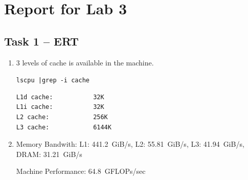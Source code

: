 \documentclass[a4paper, DIV12, headsepline]{scrartcl}
\begin{document}
\section*{Report for Lab 3}
\subsection*{Task 1 -- ERT}
\begin{enumerate}[label=\alph*)]
\item 3 levels of cache is available in the machine.

 \texttt{lscpu |grep -i cache}
\begin{verbatim}
L1d cache:           32K
L1i cache:           32K
L2 cache:            256K
L3 cache:            6144K
\end{verbatim}

\item
Memory Bandwith: L1: \SI{441.2}{GiB/s}, L2: \SI{55.81}{GiB/s}, L3: \SI{41.94}{GiB/s}, DRAM: \SI{31.21}{GiB/s}

Machine Performance: \SI{64.8} {GFLOPs/sec}
\end{enumerate}
\end{document}

